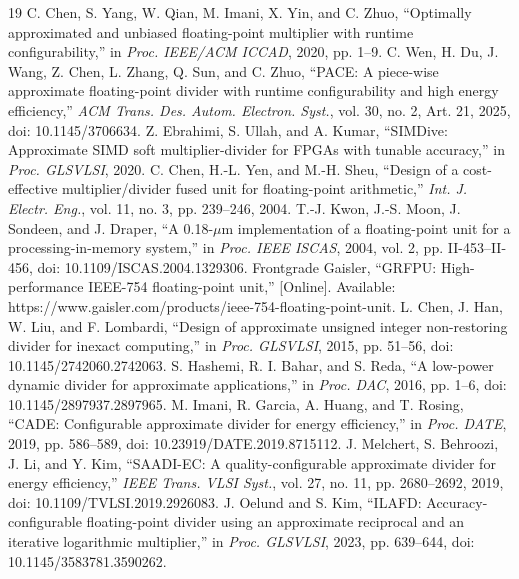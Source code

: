 \documentclass[conference]{IEEEtran}
\begin{document}
\clearpage
\begin{thebibliography}{19}
C. Chen, S. Yang, W. Qian, M. Imani, X. Yin, and C. Zhuo,
``Optimally approximated and unbiased floating-point multiplier with runtime
configurability,'' in \emph{Proc. IEEE/ACM ICCAD}, 2020, pp. 1--9.
C. Wen, H. Du, J. Wang, Z. Chen, L. Zhang, Q. Sun, and C. Zhuo,
``PACE: A piece-wise approximate floating-point divider with runtime
configurability and high energy efficiency,'' \emph{ACM Trans. Des. Autom.
Electron. Syst.}, vol. 30, no. 2, Art. 21, 2025,
doi: 10.1145/3706634.
Z. Ebrahimi, S. Ullah, and A. Kumar, ``SIMDive: Approximate SIMD soft
multiplier-divider for FPGAs with tunable accuracy,'' in \emph{Proc. GLSVLSI},
2020.
C. Chen, H.-L. Yen, and M.-H. Sheu, ``Design of a cost-effective
multiplier/divider fused unit for floating-point arithmetic,''
\emph{Int. J. Electr. Eng.}, vol. 11, no. 3, pp. 239--246, 2004.
T.-J. Kwon, J.-S. Moon, J. Sondeen, and J. Draper, ``A 0.18-$\mu$m
implementation of a floating-point unit for a processing-in-memory system,''
in \emph{Proc. IEEE ISCAS}, 2004, vol. 2, pp. II-453--II-456,
doi: 10.1109/ISCAS.2004.1329306.
Frontgrade Gaisler, ``GRFPU: High-performance IEEE-754 floating-point unit,''
[Online]. Available: https://www.gaisler.com/products/ieee-754-floating-point-unit.
L. Chen, J. Han, W. Liu, and F. Lombardi, ``Design of approximate unsigned
integer non-restoring divider for inexact computing,'' in \emph{Proc. GLSVLSI},
2015, pp. 51--56, doi: 10.1145/2742060.2742063.
S. Hashemi, R. I. Bahar, and S. Reda, ``A low-power dynamic divider for
approximate applications,'' in \emph{Proc. DAC}, 2016, pp. 1--6,
doi: 10.1145/2897937.2897965.
M. Imani, R. Garcia, A. Huang, and T. Rosing, ``CADE: Configurable approximate
divider for energy efficiency,'' in \emph{Proc. DATE}, 2019, pp. 586--589,
doi: 10.23919/DATE.2019.8715112.
J. Melchert, S. Behroozi, J. Li, and Y. Kim, ``SAADI-EC: A quality-configurable
approximate divider for energy efficiency,'' \emph{IEEE Trans. VLSI Syst.},
vol. 27, no. 11, pp. 2680--2692, 2019,
doi: 10.1109/TVLSI.2019.2926083.
J. Oelund and S. Kim, ``ILAFD: Accuracy-configurable floating-point divider
using an approximate reciprocal and an iterative logarithmic multiplier,'' in
\emph{Proc. GLSVLSI}, 2023, pp. 639--644,
doi: 10.1145/3583781.3590262.

\end{thebibliography}
\end{document}

